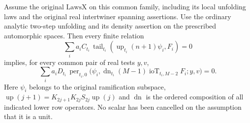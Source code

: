 \begin{proposition}
\label{prop:theta-downward-relations}
Assume the original \(\mathrm{LawsX}\) on this common family,
including its local unfolding laws and the original real
intertwiner spanning assertions. Use the ordinary analytic
two-step unfolding and its density assertion on the prescribed
automorphic spaces. Then every finite relation
\[
 \sum_i a_i C_{t_i}\,
   \operatorname{tail}_{t_i}(\operatorname{up}_{t_i}(n+1)\psi_i,F_i)=0
 \tag{RT2}
\]
implies, for every common pair of real tests \(y,v\),
\[
 \sum_i a_i D_{t_i}\,
 \operatorname{per}_{t_i,0}
   \bigl(\psi_i,
   \operatorname{dn}_{t_i}(M-1)\operatorname{ioT}_{t_i,M-2}F_i;
     y,v\bigr)=0 .
 \tag{RT3}
\]
Here \(\psi_i\) belongs to the original ramification subspace,
\(\operatorname{up}(j+1)=K_{2j+1}K_{2j}S_{2j}\operatorname{up}(j)\)
and \(\operatorname{dn}\) is the ordered composition of all
indicated lower row operators. No scalar has been cancelled on the
assumption that it is a unit.
\end{proposition}

